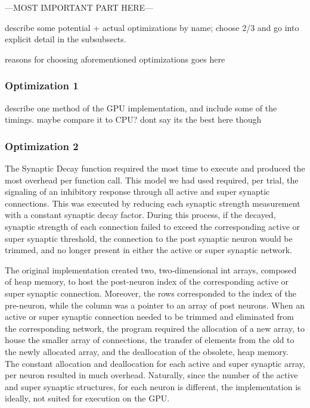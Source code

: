 \documentclass[a4paper]{article}
\begin{document}
{\huge \color{red} ---MOST IMPORTANT PART HERE---}

{\color{red} describe some potential + actual optimizations by name; choose 2/3 and go into explicit detail in the subsubsects.}

{\color{red} reasons for choosing aforementioned optimizations goes here}

\subsubsection{Optimization 1}

{\color{red} describe one method of the GPU implementation, and include some of the timings. maybe compare it to CPU? dont say its the best here though}

\subsubsection{Optimization 2}
The Synaptic Decay function required the most time to execute and produced the most overhead per function call. This model we had used required, per trial, the signaling of an inhibitory response through all active and super synaptic connections. This was executed by reducing each synaptic strength measurement with a constant synaptic decay factor. During this process, if the decayed, synaptic strength of each connection failed to exceed the corresponding active or super synaptic threshold, the connection to the post synaptic neuron would be trimmed, and no longer present in either the active or super synaptic network.

The original implementation created two, two-dimensional int arrays, composed of heap memory, to host the post-neuron index of the corresponding active or super synaptic connection. Moreover, the rows corresponded to the index of the pre-neuron, while the column was a pointer to an array of post neurons. When an active or super synaptic connection needed to be trimmed and eliminated from the corresponding network, the program required the allocation of a new array, to house the smaller array of connections, the transfer of elements from the old to the newly allocated array, and the deallocation of the obsolete, heap memory. The constant allocation and deallocation for each active and super synaptic array, per neuron resulted in much overhead. Naturally, since the number of the active and super synaptic structures, for each neuron is different, the implementation is ideally, not suited for execution on the GPU. 
\end{document}
